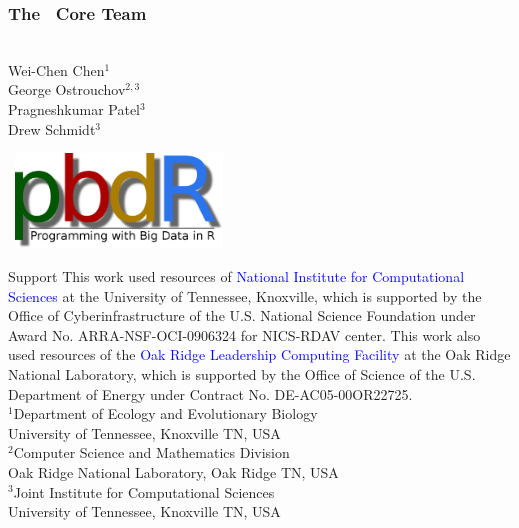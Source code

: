 \frame{\maketitle}

\setcounter{footnote}{0}

\begin{frame}[noframenumbering]
\frametitle{The \pbdR\ Core Team}
\begin{minipage}{1\textwidth}
  \vspace{-.6cm}
\begin{minipage}{3.6cm}
\ \\[.8cm]
Wei-Chen Chen$^1$ \\
George Ostrouchov$^{2,3}$ \\
Pragneshkumar Patel$^3$ \\
Drew Schmidt$^3$\\[2ex]
\end{minipage}
\begin{minipage}{7cm}
  \ \hfill \includegraphics[width=5.5cm]{../common/pics/newpbdr}
\end{minipage}
\end{minipage}

\vspace{-.4cm}
\begin{block}{Support}\tiny
  This work used resources of \textcolor{blue}{National Institute for
  Computational Sciences} at the University of Tennessee, Knoxville,
  which is supported by the Office of Cyberinfrastructure of the
  U.S. National Science Foundation under Award  No. ARRA-NSF-OCI-0906324 
  for NICS-RDAV center. 
  This work also used resources of the \textcolor{blue}{Oak Ridge
  Leadership Computing Facility} at the Oak Ridge National
  Laboratory, which is supported by the Office of Science of the
  U.S. Department of Energy under Contract No. DE-AC05-00OR22725.\\[.2cm]
  
  $^1$Department of Ecology and Evolutionary Biology\\
  University of Tennessee, Knoxville TN, USA\\[.2cm]

  $^2$Computer Science and Mathematics Division\\
  Oak Ridge National Laboratory, Oak Ridge TN, USA\\[.2cm]
  
  $^3$Joint Institute for Computational Sciences\\
  University of Tennessee, Knoxville TN, USA
\end{block}
\end{frame}


